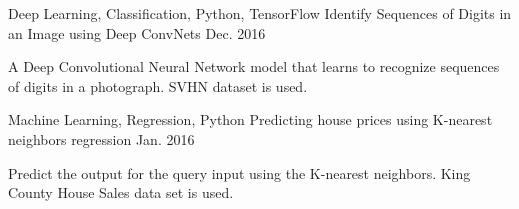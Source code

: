 \begin{cventries}
	\cventry
    {Deep Learning, Classification, Python, TensorFlow}
    {Identify Sequences of Digits in an Image using Deep ConvNets}
    {}
    {Dec. 2016}
    {
      \begin{cvitems}
        \item {A Deep Convolutional Neural Network model that learns to recognize sequences of digits in a photograph. SVHN dataset is used. }
      \end{cvitems}
    }
  \cventry
    {Machine Learning, Regression, Python}
    {Predicting house prices using K-nearest neighbors regression}
    {}
    {Jan. 2016}
    {
      \begin{cvitems}
        \item {Predict the output for the query input using the K-nearest neighbors. King County House Sales data set is used.}
      \end{cvitems}
    }

\end{cventries}
